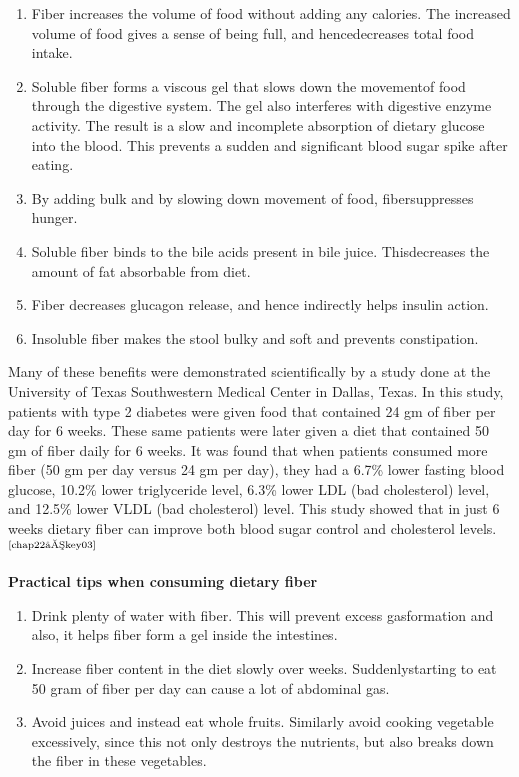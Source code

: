 \begin{enumerate}[•]
\itemsep=0pt
\item Fiber increases the volume of food without adding any calories. The increased volume of food gives a sense of being full, and hence\break decreases total food intake.
\item Soluble fiber forms a viscous gel that slows down the movement\break of food through the digestive system. The gel also interferes with digestive enzyme activity. The result is a slow and incomplete abso\-rption of dietary glucose into the blood. This prevents a sudden and significant blood sugar spike after eating.
\item By adding bulk and by slowing down movement of food, fiber\break suppresses hunger.
\item Soluble fiber binds to the bile acids present in bile juice. This\break decreases the amount of fat absorbable from diet.
\item Fiber decreases glucagon release, and hence indirectly helps insulin action.
\item Insoluble fiber makes the stool bulky and soft and prevents constipation.
\end{enumerate}

Many of these benefits were demonstrated scientifically by a study done at the University of Texas Southwestern Medical Center in Dallas, Texas. In this study, patients with type 2 diabetes were given food that contained 24 gm of fiber per day for 6 weeks. These same patients were later given a diet that contained 50 gm of fiber daily for 6 weeks. It was found that when patients consumed more fiber (50 gm per day versus 24 gm per day), they had a 6.7\% lower fasting blood glucose, 10.2\% lower triglyceride level, 6.3\% lower LDL (bad cholesterol) level, and 12.5\% lower VLDL (bad cholesterol) level. This study showed that in just 6 weeks dietary fiber can improve both blood sugar control and cholesterol levels.$^{\text{\cite{chap22–key03}}}$

\noindent\textbf{Practical tips when consuming dietary fiber}

\begin{enumerate}[•]
\itemsep=0pt
\item Drink plenty of water with fiber. This will prevent excess gas\break formation and also, it helps fiber form a gel inside the intestines.
\item Increase fiber content in the diet slowly over weeks. Suddenly\break starting to eat 50 gram of fiber per day can cause a lot of abdominal gas.
\item Avoid juices and instead eat whole fruits. Similarly avoid cooking vegetable excessively, since this not only destroys the nutrients, but also breaks down the fiber in these vegetables.
\end{enumerate}

